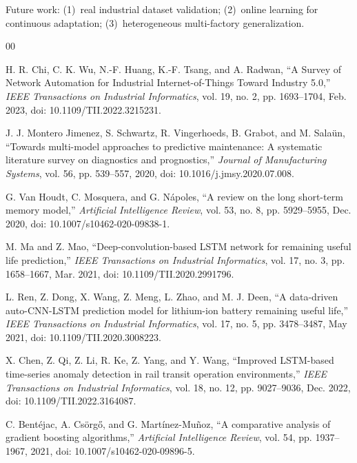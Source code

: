 \documentclass[conference]{IEEEtran}
\begin{document}
Future work: (1)~real industrial dataset validation; (2)~online learning for
continuous adaptation; (3)~heterogeneous multi-factory generalization.


\begin{thebibliography}{00}

H. R. Chi, C. K. Wu, N.-F. Huang, K.-F. Tsang, and A. Radwan, ``A Survey of Network Automation for Industrial Internet-of-Things Toward Industry 5.0,'' \textit{IEEE Transactions on Industrial Informatics}, vol. 19, no. 2, pp. 1693--1704, Feb. 2023, doi: 10.1109/TII.2022.3215231.

J. J. Montero Jimenez, S. Schwartz, R. Vingerhoeds, B. Grabot, and M. Salaün, ``Towards multi-model approaches to predictive maintenance: A systematic literature survey on diagnostics and prognostics,'' \textit{Journal of Manufacturing Systems}, vol. 56, pp. 539--557, 2020, doi: 10.1016/j.jmsy.2020.07.008.

G. Van Houdt, C. Mosquera, and G. Nápoles, ``A review on the long short-term memory model,'' \textit{Artificial Intelligence Review}, vol. 53, no. 8, pp. 5929--5955, Dec. 2020, doi: 10.1007/s10462-020-09838-1.

M. Ma and Z. Mao, ``Deep-convolution-based LSTM network for remaining useful life prediction,'' \textit{IEEE Transactions on Industrial Informatics}, vol. 17, no. 3, pp. 1658--1667, Mar. 2021, doi: 10.1109/TII.2020.2991796.

L. Ren, Z. Dong, X. Wang, Z. Meng, L. Zhao, and M. J. Deen, ``A data-driven auto-CNN-LSTM prediction model for lithium-ion battery remaining useful life,'' \textit{IEEE Transactions on Industrial Informatics}, vol. 17, no. 5, pp. 3478--3487, May 2021, doi: 10.1109/TII.2020.3008223.

X. Chen, Z. Qi, Z. Li, R. Ke, Z. Yang, and Y. Wang, ``Improved LSTM-based time-series anomaly detection in rail transit operation environments,'' \textit{IEEE Transactions on Industrial Informatics}, vol. 18, no. 12, pp. 9027--9036, Dec. 2022, doi: 10.1109/TII.2022.3164087.

C. Bentéjac, A. Csörgő, and G. Martínez-Muñoz, ``A comparative analysis of gradient boosting algorithms,'' \textit{Artificial Intelligence Review}, vol. 54, pp. 1937--1967, 2021, doi: 10.1007/s10462-020-09896-5.


\end{thebibliography}
\end{document}
